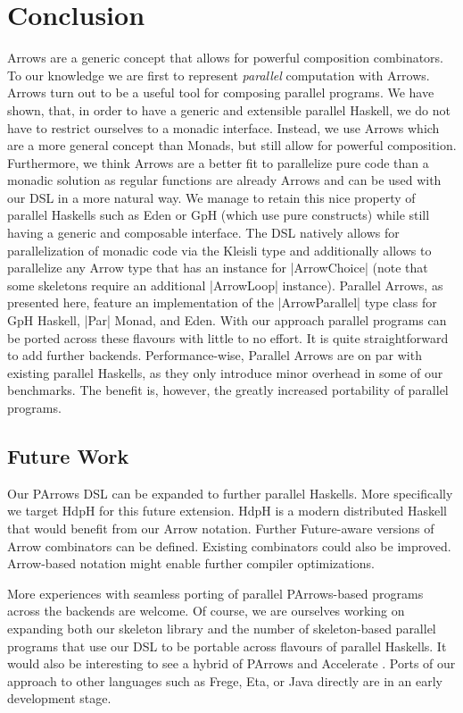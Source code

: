 
\section{Conclusion}
\label{sec:conclusion}
Arrows are a generic concept that allows for powerful composition
combinators. To our knowledge we are first to represent
\emph{parallel} computation with Arrows.
%
Arrows turn out to be a useful tool for composing parallel
programs. We have shown, that, in order to have a generic and extensible parallel Haskell, we do not have to restrict ourselves to a monadic interface. Instead, we use Arrows which are a more general concept than Monads, but still allow for powerful composition. Furthermore, we think Arrows are a better fit to parallelize pure code than a monadic solution as regular functions are already Arrows and can be used with our DSL in a more natural way. We manage to retain this nice property of parallel Haskells such as Eden or GpH (which use pure constructs) while still having a generic and composable interface.
%
The DSL natively allows for parallelization of monadic code via the Kleisli type and additionally allows to parallelize any Arrow type that has an instance for |ArrowChoice| (note that some skeletons require an additional |ArrowLoop| instance).
%
Parallel Arrows, as presented here, feature an implementation of the |ArrowParallel| type class for GpH Haskell, |Par| Monad, and Eden. With our approach parallel programs can be ported across these flavours with little to no effort. It is quite straightforward to add further backends.
%
%
Performance-wise, Parallel Arrows are on par with existing parallel Haskells, as they only introduce minor overhead in some of our benchmarks.
%
The benefit is, however, the greatly increased portability of parallel programs.



\subsection{Future Work}
\label{sec:future-work}

Our PArrows DSL can be expanded to further parallel Haskells. More specifically we target HdpH \cite{Maier:2014:HDS:2775050.2633363} for this future extension. HdpH is a modern distributed Haskell that would benefit from our Arrow notation. Further Future-aware versions of Arrow combinators can be defined. Existing combinators could also be improved.
Arrow-based notation might enable further compiler optimizations.

More experiences with seamless porting of parallel PArrows-based programs across the backends are welcome.
Of course, we are ourselves working on expanding both our skeleton library and the number of skeleton-based parallel programs that use our DSL to be portable across flavours of parallel Haskells.
It would also be interesting to see a hybrid of PArrows and Accelerate \cite{McDonell:2015:TRC:2887747.2804313}.
Ports of our approach to other languages such as Frege, Eta, or Java directly are in an early development stage.
